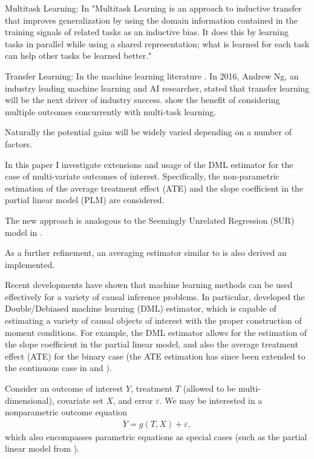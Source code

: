 \documentclass[12pt]{article}
\begin{document}
	
	
	 Multitask Learning: In \cite{caruana1997multitask} "Multitask Learning is an approach to inductive transfer that improves generalization by using the domain information contained in the training signals of related tasks as an inductive bias. It does this by learning tasks in parallel while using a shared representation; what is learned for each task can help other tasks be learned better."
	
	Transfer Learning: In the machine learning literature \cite{pratt1993discriminability}. In 2016, Andrew Ng, an industry leading machine learning and AI researcher, stated that transfer learning will be the next driver of industry success. \cite{maurer2016benefit} show the benefit of considering multiple outcomes concurrently with multi-task learning. 
	
	Naturally the potential gains will be widely varied depending on a number of factors. 
	
	In this paper I investigate extensions and usage of the DML estimator for the case of multi-variate outcomes of interest. Specifically, the non-parametric estimation of the average treatment effect (ATE) and the slope coefficient in the partial linear model (PLM) are considered. 
	
	The new approach is analogous to the Seemingly Unrelated Regression (SUR) model in \cite{zellner}.
	
	As a further refinement, an averaging estimator similar to \cite{mehrabani2020improved} is also derived an implemented. 
	
	Recent developments have shown that machine learning methods can be used effectively for a variety of causal inference problems. In particular, \cite{chernozhukov2018double} developed the Double/Debiased machine learning (DML) estimator, which is capable of estimating a variety of causal objects of interest with the proper construction of moment conditions. For example, the DML estimator allows for the estimation of the slope coefficient in the partial linear model, and also the average treatment effect (ATE) for the binary case (the ATE estimation has since been extended to the continuous case in \cite{su2019non} and \cite{colangelo2020double}).
	
	Consider an outcome of interest $Y$, treatment $T$ (allowed to be multi-dimensional), covariate set $X$, and error $\varepsilon$. We may be interested in a nonparametric outcome equation
	\begin{align}
	Y = g(T,X) + \varepsilon\label{eq:1},
	\end{align}
	which also encompasses parametric equations as special cases (such as the partial linear model from \cite{robinson1988root}). 
	
\end{document}
